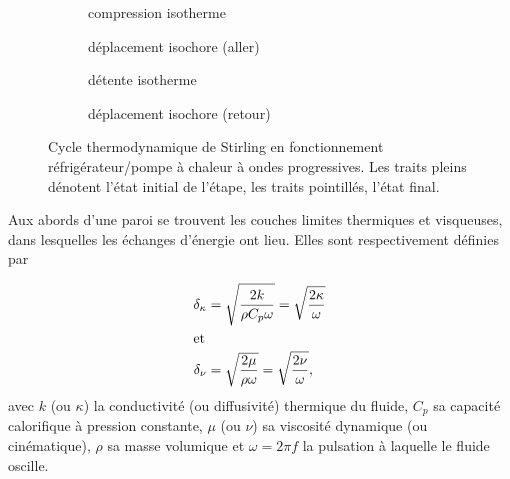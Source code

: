 \begin{figure}[!ht]
	\centering
	\begin{subfigure}{.47\textwidth}
		\centering
		
		\caption{compression isotherme}
		\label{fig:CycleStirling_Comp}
	\end{subfigure}
	\begin{subfigure}{.47\textwidth}
		\centering
		
		\caption{déplacement isochore (aller)}
		\label{fig:CycleStirling_DepIsoch1}
	\end{subfigure}
	
	\vspace{5mm}
	\begin{subfigure}{.47\textwidth}
		\centering
		
		\caption{détente isotherme}
		\label{fig:CycleStirling_Detente}
	\end{subfigure}
	\begin{subfigure}{.47\textwidth}
		\centering
		
		\caption{déplacement isochore (retour)}
		\label{fig:CycleStirling_DepIsoch2}
	\end{subfigure}	
	\caption[Cycle de Stirling des machines à ondes progressives]{Cycle thermodynamique de Stirling en fonctionnement réfrigérateur/pompe à chaleur à ondes progressives. Les traits pleins dénotent l'état initial de l'étape, les traits pointillés, l'état final.}
	\label{fig:CycleStirling}
\end{figure} %



Aux abords d'une paroi se trouvent les couches limites thermiques et visqueuses, dans lesquelles les échanges d'énergie ont lieu. Elles sont respectivement définies par

\begin{subequations}
	\begin{align}
		\delta_{\kappa} &= \sqrt{\frac{2 k}{\rho C_p \omega}} = \sqrt{\frac{2 \kappa}{\omega}}	\label{eq:CouchesLimites_Thermique}\\
		\intertext{et}
		\delta_{\nu} &= \sqrt{\frac{2 \mu}{\rho \omega}} = \sqrt{\frac{2 \nu}{\omega}},	\label{eq:CouchesLimites_Visqueuse}
	\end{align}
	\label{eq:CouchesLimites}%
\end{subequations}
avec $k$ (ou $\kappa$) la conductivité (ou diffusivité) thermique du fluide, $C_p$ sa capacité calorifique à pression constante, $\mu$ (ou $\nu$) sa viscosité dynamique (ou cinématique), $\rho$ sa masse volumique et $\omega = 2\pi f$ la pulsation à laquelle le fluide oscille.

